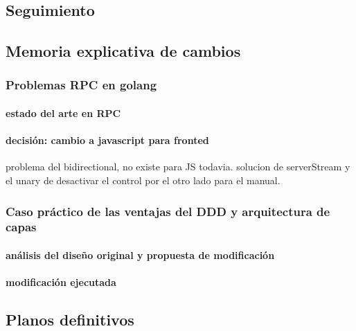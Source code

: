 \subsection{Seguimiento}\label{subsec:seguimiento}
    
\subsection{Memoria explicativa de cambios}\label{subsec:memoria explicativa de cambios}
    \subsubsection{Problemas RPC en golang}\label{subsec:problemas-rpc-en-golang}
        \paragraph{estado del arte en RPC}
        \paragraph{decisión: cambio a javascript para fronted}
            problema del bidirectional, no existe para JS todavia. solucion de serverStream y el unary de desactivar el control por el otro lado para el manual.
    \subsubsection{Caso práctico de las ventajas del DDD y arquitectura de capas}
        \paragraph{análisis del diseño original y propuesta de modificación}
        \paragraph{modificación ejecutada}
\subsection{Planos definitivos}\label{subsec:planos definitivos}

